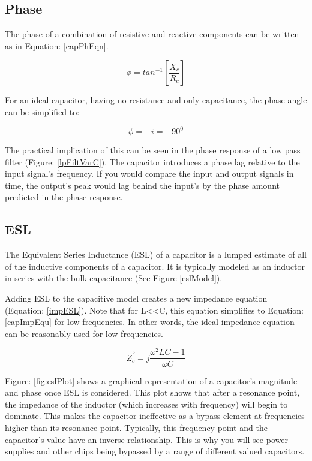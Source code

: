 

\subsection{Phase}

The phase of a combination of resistive and reactive components can be written as in Equation: \eqref{capPhEqn}.

\begin{equation}
\label{capPhEqn}
\phi = tan^{-1}[\frac{X_c}{R_c}]
\end{equation}

For an ideal capacitor, having no resistance and only capacitance, the phase angle can be simplified to:

\begin{equation}
\label{capImpEqu2}
\phi = -i = -90^0
\end{equation}

The practical implication of this can be seen in the phase response of a low pass filter (Figure: \ref{lpFiltVarC}). The capacitor introduces a phase lag relative to the input signal's frequency. If you would compare the input and output signals in time, the output's peak would lag behind the input's by the phase amount predicted in the phase response.


\subsection{ESL}

The Equivalent Series Inductance (ESL) of a capacitor is a lumped estimate of all of the inductive components of a capacitor. It is typically modeled as an inductor in series with the bulk capacitance (See Figure \ref{eslModel}).



Adding ESL to the capacitive model creates a new impedance equation (Equation: \eqref{impESL}). Note that for L\textless \textless C, this equation simplifies to Equation: \eqref{capImpEqu} for low frequencies. In other words, the ideal impedance equation can be reasonably used for low frequencies.

\begin{equation}
\label{impESL}
\vec{Z_c} = j\frac{\omega ^2LC - 1}{\omega C}
\end{equation}



Figure: \ref{fig:eslPlot} shows a graphical representation of a capacitor's magnitude and phase once ESL is considered. This plot shows that after a resonance point, the impedance of the inductor (which increases with frequency) will begin to dominate. This makes the capacitor ineffective as a bypass element at frequencies higher than its resonance point. Typically, this frequency point and the capacitor's value have an inverse relationship. This is why you will see power supplies and other chips being bypassed by a range of different valued capacitors. 


